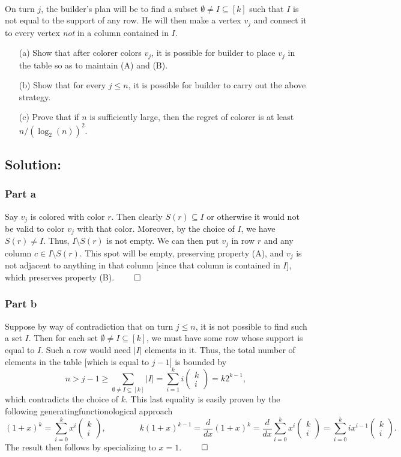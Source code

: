 \documentclass[10pt,a4paper]{article}
\newcommand{\cho}[2]{\begin{pmatrix}#1\\#2\end{pmatrix}}
\newcommand{\1}{\mathbf{1}}
\begin{document}
\paragraph*{}On turn $j$, the builder's plan will be to find a subset $\emptyset \neq I \subseteq [k]$ such that $I$ is not equal to the support of any row.  He will then make a vertex $v_j$ and connect it to every vertex \textit{not} in a column contained in $I$.
\begin{itemize}
\item[(a)] Show that after colorer colors $v_{j}$, it is possible for builder to place $v_j$ in the table so as to maintain (A) and (B).
\item[(b)] Show that for every $j \leq n$, it is possible for builder to carry out the above strategy.
\item[(c)] Prove that if $n$ is sufficiently large, then the regret of colorer is at least $n/(\log_2 (n))^2$.
\end{itemize}
\subsection*{Solution:}
\subsubsection*{Part a}
Say $v_j$ is colored with color $r$.  Then clearly $S(r) \subseteq I$ or otherwise it would not be valid to color $v_j$ with that color.  Moreover, by the choice of $I$, we have $S(r) \neq I$.  Thus, $I \setminus S(r)$ is not empty.  We can then put $v_j$ in row $r$ and any column $c \in I \setminus S(r)$.  This spot will be empty, preserving property (A), and $v_j$ is not adjacent to anything in that column [since that column is contained in $I$], which preserves property (B). $\qed$

\subsubsection*{Part b}
Suppose by way of contradiction that on turn $j \leq n$, it is not possible to find such a set $I$.  Then for each set $\emptyset \neq I \subseteq [k]$, we must have some row whose support is equal to $I$.  Such a row would need $|I|$ elements in it.  Thus, the total number of elements in the table [which is equal to $j-1$] is bounded by
\[
n > j-1 \geq \sum_{\emptyset \neq I \subseteq [k]} |I| = \sum_{i=1}^{k} i \cho{k}{i} = k 2^{k-1},
\]
which contradicts the choice of $k$.  This last equality is easily proven by the following generatingfunctionological approach
\[
(1 + x)^{k} = \sum_{i=0} ^{k} x^{i} \cho{k}{i}, \qquad \qquad k (1+x)^{k-1} = \dfrac{d}{d x} (1 + x)^{k} = \dfrac{d}{dx} \sum_{i=0} ^{k} x^{i} \cho{k}{i} = \sum_{i=0} ^{k} i x^{i-1} \cho{k}{i}.
\]
The result then follows by specializing to $x=1$. $\qed$
\end{document}
